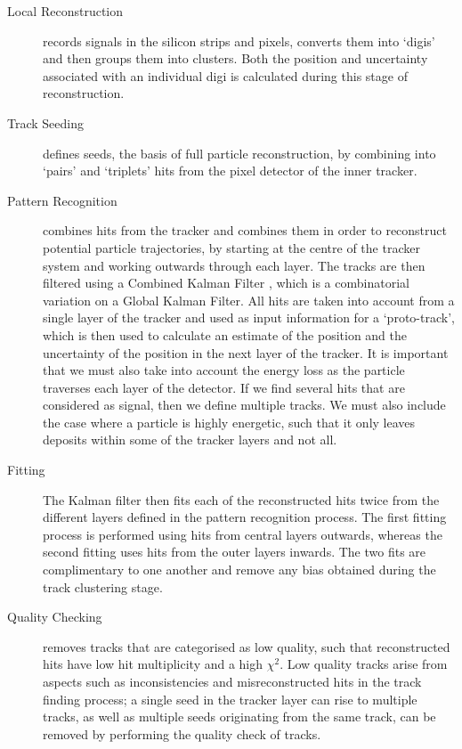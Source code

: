 \begin{description}
	\item[Local Reconstruction] records signals in the silicon strips and pixels, converts them into `digis' and then groups them into 
	clusters. Both the position and uncertainty associated with an individual digi is calculated during this stage of reconstruction.
	\item[Track Seeding] defines seeds, the basis of full particle reconstruction, by combining into `pairs' and `triplets' hits from the pixel 
	detector of the inner tracker.
	\item[Pattern Recognition] combines hits from the tracker and combines them in order to reconstruct potential particle trajectories, by 
	starting at the centre of the tracker system and working outwards through each layer. The tracks are then filtered using a Combined Kalman 
	Filter \cite{Billoir1989390}, which is a combinatorial variation on a Global Kalman Filter. All hits are taken into account from a single 
	layer of the tracker and used as input information for a `proto-track', which is then used to calculate an estimate of the position and the 
	uncertainty of the position in the next layer of the tracker. It is important that we must also take into account the energy loss as the 
	particle traverses each layer of the detector. If we find several hits that are considered as signal, then we define multiple tracks. We 
	must also include the case where a particle is highly energetic, such that it only leaves deposits within some of the tracker layers and 
	not all.
	\item[Fitting] The Kalman filter then fits each of the reconstructed hits twice from the different layers defined in the pattern 
	recognition process. The first fitting process is performed using hits from central layers outwards, whereas the second fitting uses hits 
	from the outer layers inwards. The two fits are complimentary to one another and remove any bias obtained during the track clustering stage.
	\item[Quality Checking] removes tracks that are categorised as low quality, such that reconstructed hits have low hit multiplicity and a 
	high $\chi^2$. Low quality tracks arise from aspects such as inconsistencies and misreconstructed hits in the track finding process; a 
	single seed in the tracker layer can rise to multiple tracks, as well as multiple seeds originating from the same track, can be removed by 
	performing the quality check of tracks. 
\end{description}
 
